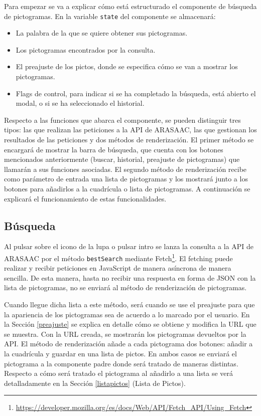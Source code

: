 Para empezar se va a explicar cómo está estructurado el componente de búsqueda de pictogramas. En la variable \texttt{state} del componente se almacenará:

\begin{itemize}
	\item La palabra de la que se quiere obtener sus pictogramas.
	\item Los pictogramas encontrados por la consulta.
	\item El preajuste de los pictos, donde se especifica cómo se van a mostrar los pictogramas.
	\item Flags de control, para indicar si se ha completado la búsqueda, está abierto el modal, o si se ha seleccionado el historial.     
\end{itemize}

Respecto a las funciones que abarca el componente, se pueden distinguir tres tipos: las que realizan las peticiones a la API de ARASAAC, las que gestionan los resultados de las peticiones y dos métodos de renderización. El primer método se encargará de mostrar la barra de búsqueda, que cuenta con los botones mencionados anteriormente (buscar, historial, preajuste de pictogramas) que llamarán a sus funciones asociadas. El segundo método de renderización recibe como parámetro de entrada una lista de pictogramas y los mostrará junto a los botones para añadirlos a la cuadrícula o lista de pictogramas. A continuación se explicará el funcionamiento de estas funcionalidades. 


\subsection{Búsqueda}

Al pulsar sobre el icono de la lupa o pulsar intro se lanza la consulta a la API de ARASAAC por el método \texttt{bestSearch} mediante Fetch\footnote{\url{https://developer.mozilla.org/es/docs/Web/API/Fetch_API/Using_Fetch}}. El fetching puede realizar y recibir peticiones en JavaScript de manera asíncrona de manera sencilla. De esta manera, hasta no recibir una respuesta en forma de JSON con la lista de pictogramas, no se enviará al método de renderización de pictogramas. 

Cuando llegue dicha lista a este método, será cuando se use el preajuste para que la apariencia de los pictogramas sea de acuerdo a lo marcado por el usuario. En la Sección \ref{preajuste} se explica en detalle cómo se obtiene y modifica la URL que se muestra. Con la URL creada, se mostrarán los pictogramas devueltos por la API. El método de renderización añade a cada pictograma dos botones: añadir a la cuadrícula y guardar en una lista de pictos. En ambos casos se enviará el pictograma a la componente padre donde será tratado de maneras distintas. Respecto a cómo será tratado el pictograma al añadirlo a una lista se verá detalladamente en la Sección \ref{listapictos} (Lista de Pictos).

